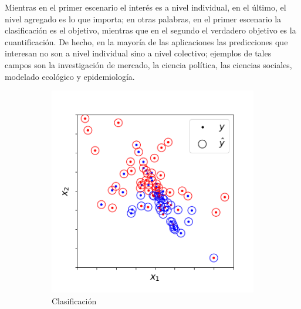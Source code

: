 Mientras en el primer escenario el interés es a nivel individual, en el último,
el nivel agregado es lo que importa; en otras palabras, en el primer escenario
la clasificación es el objetivo, mientras que en el segundo el verdadero
objetivo es la cuantificación. De hecho, en la mayoría de las aplicaciones las
predicciones que interesan no son a nivel individual sino a nivel colectivo;
ejemplos de tales campos son la investigación de mercado, la ciencia política,
las ciencias sociales, modelado ecológico y epidemiología.

\begin{figure}[H]
    \centering
    \begin{subfigure}[t]{0.4\textwidth}
        \includegraphics[width=\textwidth]{../plots_teoria/intro_scatterplot.png}
        \caption{Clasificación}
    \end{subfigure}
    \hfill
    \begin{subfigure}[t]{0.4\textwidth}

\end{subfigure}
\end{figure}
